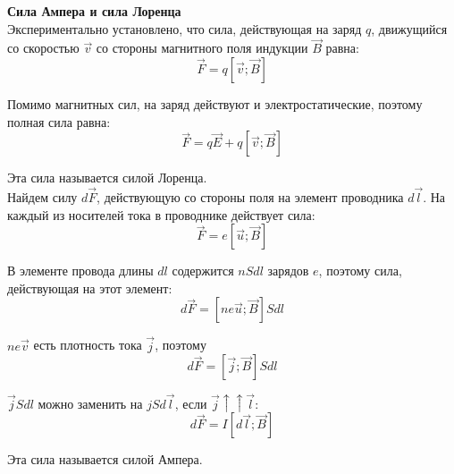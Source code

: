 \documentclass{article}
\begin{document}
	
	\textbf{Сила Ампера и сила Лоренца}\\

	Экспериментально установлено, что сила, действующая на заряд $q$, движущийся со скоростью $\vec v$ со стороны магнитного поля индукции $\vec B$ равна:
	\begin{equation}
		\vec F = q[\vec v;\vec B]
	\end{equation}

	Помимо магнитных сил, на заряд действуют и электростатические, поэтому полная сила равна:
	\begin{equation}
		\vec F = q\vec E + q[\vec v;\vec B]
	\end{equation}

	Эта сила называется силой Лоренца.\\

	Найдем силу $d\vec F$, действующую со стороны поля на элемент проводника $d\vec l$. На каждый из носителей тока в проводнике действует сила:
	\begin{equation}
		\vec F = e[\vec u;\vec B]
	\end{equation}

	В элементе провода длины $dl$ содержится $nSdl$ зарядов $e$, поэтому сила, действующая на этот элемент:
	\begin{equation}
		d\vec F = [ne\vec u;\vec B]Sdl
	\end{equation} 

	$ne\vec v$ есть плотность тока $\vec j$, поэтому
	\begin{equation}
		d\vec F = [\vec j;\vec B]Sdl
	\end{equation}

	$\vec jSdl$ можно заменить на $jSd\vec l$, если $\vec j \uparrow\uparrow \vec l$:
	\begin{equation}
		d\vec F = I[d\vec l;\vec B]
	\end{equation}

	Эта сила называется силой Ампера.
\end{document}
